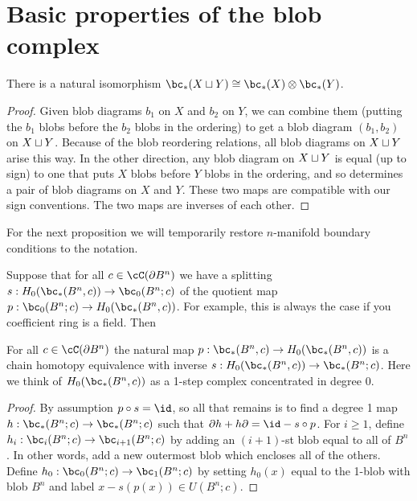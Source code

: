 \documentclass[11pt,leqno]{amsart}
\begin{document}




\section{Basic properties of the blob complex}
\label{sec:basic-properties}

\begin{prop} \label{disjunion}
There is a natural isomorphism $\bc_*(X \du Y) \cong \bc_*(X) \otimes \bc_*(Y)$.
\end{prop}
\begin{proof}
Given blob diagrams $b_1$ on $X$ and $b_2$ on $Y$, we can combine them
(putting the $b_1$ blobs before the $b_2$ blobs in the ordering) to get a
blob diagram $(b_1, b_2)$ on $X \sqcup Y$.
Because of the blob reordering relations, all blob diagrams on $X \sqcup Y$ arise this way.
In the other direction, any blob diagram on $X\sqcup Y$ is equal (up to sign)
to one that puts $X$ blobs before $Y$ blobs in the ordering, and so determines
a pair of blob diagrams on $X$ and $Y$.
These two maps are compatible with our sign conventions.
The two maps are inverses of each other.
\end{proof}

For the next proposition we will temporarily restore $n$-manifold boundary
conditions to the notation.

Suppose that for all $c \in \cC(\bd B^n)$
we have a splitting $s: H_0(\bc_*(B^n, c)) \to \bc_0(B^n; c)$
of the quotient map
$p: \bc_0(B^n; c) \to H_0(\bc_*(B^n, c))$.
For example, this is always the case if you coefficient ring is a field.
Then
\begin{prop} \label{bcontract}
For all $c \in \cC(\bd B^n)$ the natural map $p: \bc_*(B^n, c) \to H_0(\bc_*(B^n, c))$
is a chain homotopy equivalence
with inverse $s: H_0(\bc_*(B^n, c)) \to \bc_*(B^n; c)$.
Here we think of $H_0(\bc_*(B^n, c))$ as a 1-step complex concentrated in degree 0.
\end{prop}
\begin{proof}
By assumption $p\circ s = \id$, so all that remains is to find a degree 1 map
$h : \bc_*(B^n; c) \to \bc_*(B^n; c)$ such that $\bd h + h\bd = \id - s \circ p$.
For $i \ge 1$, define $h_i : \bc_i(B^n; c) \to \bc_{i+1}(B^n; c)$ by adding
an $(i{+}1)$-st blob equal to all of $B^n$.
In other words, add a new outermost blob which encloses all of the others.
Define $h_0 : \bc_0(B^n; c) \to \bc_1(B^n; c)$ by setting $h_0(x)$ equal to
the 1-blob with blob $B^n$ and label $x - s(p(x)) \in U(B^n; c)$.
\end{proof}
\end{document}
